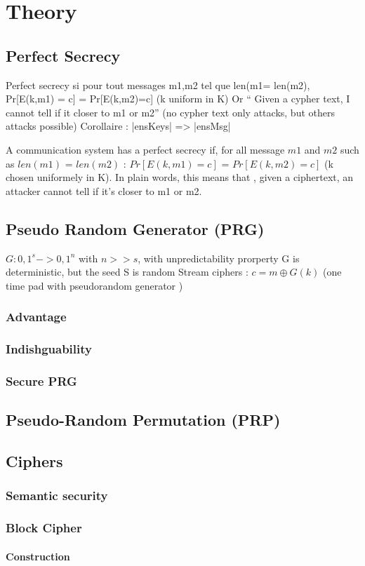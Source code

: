 \chapter{Theory}

\section{Perfect Secrecy}
Perfect secrecy si pour tout messages m1,m2 tel que len(m1= len(m2), 
Pr[E(k,m1) = c] = Pr[E(k,m2)=c] (k uniform in K)
Or “ Given a cypher text, I cannot tell if it closer to m1 or m2”  (no cypher text only attacks, but others attacks possible)
Corollaire : |ensKeys| => |ensMsg|

A communication system has a perfect secrecy if, for all message $m1$ and $m2$ such as $len(m1)$ = $len(m2)$ :  $ Pr[E(k,m1) = c]$ = $Pr[E(k,m2)=c]$ (k chosen uniformely in K).
In plain words, this means that , given a ciphertext,  an attacker cannot tell if it's closer to m1 or m2.

\section{Pseudo Random Generator (PRG)} 
$ G : {0,1}^s -> {0,1}^n $  with  $n>>s$, with unpredictability prorperty
G is deterministic, but the seed S is random
Stream ciphers : $c = m \oplus G(k) $  (one time pad with pseudorandom generator )


\subsection{Advantage}
\subsection{Indishguability}
\subsection{Secure PRG}

\section{Pseudo-Random Permutation (PRP)}

\section{Ciphers}
\subsection{Semantic security}
\subsection{Block Cipher}
\subsubsection{Construction}



